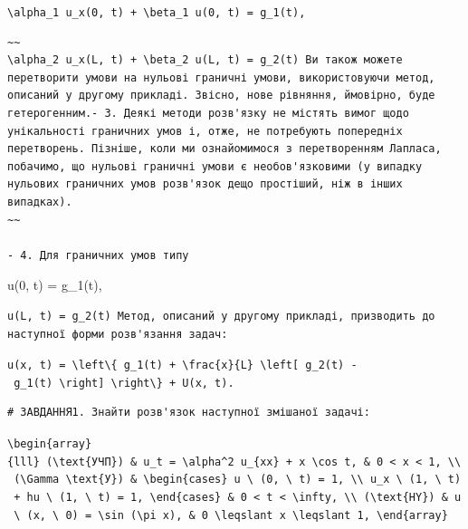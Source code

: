 \documentclass[
  ukrainian,
]{article}
\begin{document}
\texttt{\textbackslash{}alpha\_1\ u\_x(0,\ t)\ +\ \textbackslash{}beta\_1\ u(0,\ t)\ =\ g\_1(t),}

\begin{verbatim}
~~
\alpha_2 u_x(L, t) + \beta_2 u(L, t) = g_2(t) Ви також можете перетворити умови на нульові граничні умови, використовуючи метод, описаний у другому прикладі. Звісно, нове рівняння, ймовірно, буде гетерогенним.- 3. Деякі методи розв'язку не містять вимог щодо унікальності граничних умов і, отже, не потребують попередніх перетворень. Пізніше, коли ми ознайомимося з перетворенням Лапласа, побачимо, що нульові граничні умови є необов'язковими (у випадку нульових граничних умов розв'язок дещо простіший, ніж в інших випадках).
~~

- 4. Для граничних умов типу
\end{verbatim}

u(0, t) = g\_1(t),

\begin{verbatim}
u(L, t) = g_2(t) Метод, описаний у другому прикладі, призводить до наступної форми розв'язання задач:
\end{verbatim}

\texttt{u(x,\ t)\ =\ \textbackslash{}left\textbackslash{}\{\ g\_1(t)\ +\ \textbackslash{}frac\{x\}\{L\}\ \textbackslash{}left{[}\ g\_2(t)\ -\ g\_1(t)\ \textbackslash{}right{]}\ \textbackslash{}right\textbackslash{}\}\ +\ U(x,\ t).}

\begin{verbatim}
# ЗАВДАННЯ1. Знайти розв'язок наступної змішаної задачі:
\end{verbatim}

\texttt{\textbackslash{}begin\{array\}\{lll\}\ (\textbackslash{}text\{УЧП\})\ \&\ u\_t\ =\ \textbackslash{}alpha\^{}2\ u\_\{xx\}\ +\ x\ \textbackslash{}cos\ t,\ \&\ 0\ \textless{}\ x\ \textless{}\ 1,\ \textbackslash{}\textbackslash{}\ (\textbackslash{}Gamma\ \textbackslash{}text\{У\})\ \&\ \textbackslash{}begin\{cases\}\ u\ \textbackslash{}\ (0,\ \textbackslash{}\ t)\ =\ 1,\ \textbackslash{}\textbackslash{}\ u\_x\ \textbackslash{}\ (1,\ \textbackslash{}\ t)\ +\ hu\ \textbackslash{}\ (1,\ \textbackslash{}\ t)\ =\ 1,\ \textbackslash{}end\{cases\}\ \&\ 0\ \textless{}\ t\ \textless{}\ \textbackslash{}infty,\ \textbackslash{}\textbackslash{}\ (\textbackslash{}text\{HY\})\ \&\ u\ \textbackslash{}\ (x,\ \textbackslash{}\ 0)\ =\ \textbackslash{}sin\ (\textbackslash{}pi\ x),\ \&\ 0\ \textbackslash{}leqslant\ x\ \textbackslash{}leqslant\ 1,\ \textbackslash{}end\{array\}}
\end{document}
